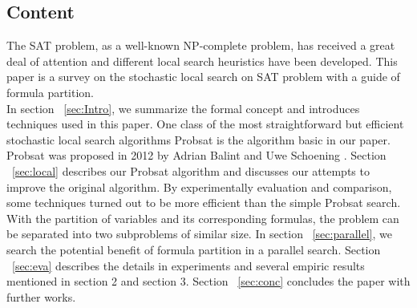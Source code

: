 \documentclass[12pt,a4paper,twoside]{scrartcl}
\numberwithin{equation}{section}
\begin{document}
\subsection{Content} 
The SAT problem, as a well-known NP-complete problem, has received a great deal of attention and different local search heuristics have been developed. This paper is a survey on the stochastic local search on SAT problem with a guide of formula partition. \\
In section ~\ref{sec:Intro}, we summarize the formal concept and introduces techniques used in this paper. 
One class of the most straightforward but efficient stochastic local search algorithms Probsat is the algorithm basic in our paper. Probsat was proposed in 2012 by Adrian Balint and Uwe Schoening \cite{balint2016engineering}. Section ~\ref{sec:local} describes our Probsat algorithm and discusses our attempts to improve the original algorithm. By experimentally evaluation and comparison, some techniques turned out to be more efficient than the simple Probsat search. With the partition of variables and its corresponding formulas, the problem can be separated into two subproblems of similar size.  In section ~\ref{sec:parallel}, we search the potential benefit of formula partition in a parallel search. Section ~\ref{sec:eva} describes the details in experiments and several empiric results mentioned in section 2 and section 3.  Section ~\ref{sec:conc} concludes the paper with further works. 
\end{document}

